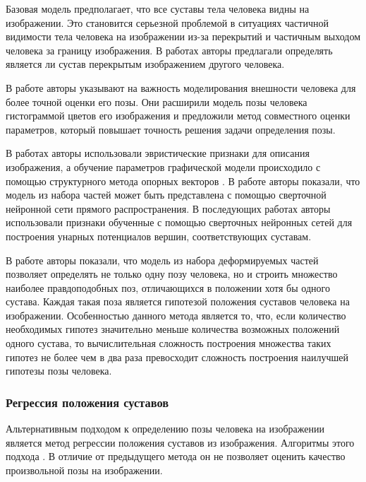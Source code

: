 Базовая модель предполагает, что все суставы тела человека видны на изображении. Это становится серьезной проблемой в ситуациях частичной видимости тела человека на изображении из-за перекрытий и частичным выходом человека за границу изображения. В работах \cite{ghiasi2014parsing,chen2015parsing} авторы предлагали определять является ли сустав перекрытым изображением другого человека.

В работе \cite{chou2013modeling} авторы указывают на важность моделирования внешности человека для более точной оценки его позы. Они расширили модель позы человека гистограммой цветов его изображения и предложили метод совместного оценки параметров, который повышает точность решения задачи определения позы.

В работах \cite{yang2011articulated,pirsiavash2012steerable,ghiasi2014parsing,pishchulin2013poselet} авторы использовали эвристические признаки для описания изображения, а обучение параметров графической модели происходило с помощью структурного метода опорных векторов \cite{finley2008training}. В работе \cite{girshick2015deformable} авторы показали, что модель из набора частей может быть представлена с помощью сверточной нейронной сети прямого распространения. В последующих работах \cite{chen2014articulated,tompson2014joint,chen2015parsing} авторы использовали признаки обученные с помощью сверточных нейронных сетей для построения унарных потенциалов вершин, соответствующих суставам.

В работе \cite{park2011n} авторы показали, что модель из набора деформируемых частей позволяет определять не только одну позу человека, но и строить множество наиболее правдоподобных поз, отличающихся в положении хотя бы одного сустава. Каждая такая поза является гипотезой положения суставов человека на изображении. Особенностью данного метода является то, что, если количество необходимых гипотез значительно меньше количества возможных положений одного сустава, то вычислительная сложность построения множества таких гипотез не более чем в два раза превосходит сложность построения наилучшей гипотезы позы человека.

\subsubsection{Регрессия положения суставов}

Альтернативным подходом к определению позы человека на изображении является метод регрессии положения суставов из изображения. Алгоритмы этого подхода . В отличие от предыдущего метода он не позволяет оценить качество произвольной позы на изображении.

